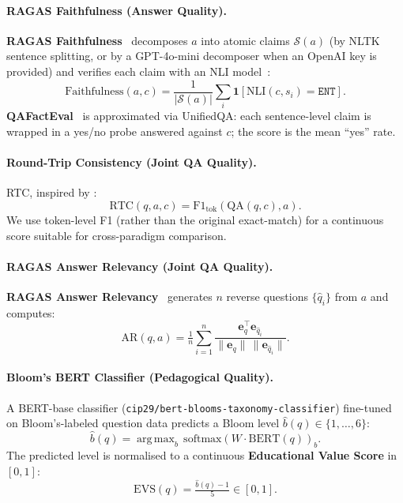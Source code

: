 \documentclass[11pt]{article}
\theoremstyle{plain}
\theoremstyle{definition}
\theoremstyle{remark}
\DeclareMathOperator*{\argmax}{arg\,max}
\begin{document}
\paragraph{RAGAS Faithfulness (Answer Quality).}
\textbf{RAGAS Faithfulness}~\citep{es2023ragas}
decomposes $a$ into atomic claims $\mathcal{S}(a)$
(by NLTK sentence splitting, or by a GPT-4o-mini
decomposer when an OpenAI key is provided) and
verifies each claim with an NLI
model~\citep{he2021deberta}:
\begin{equation}
  \mathrm{Faithfulness}(a, c)
  = \frac{1}{|\mathcal{S}(a)|}\!
    \sum_i \mathbf{1}[\mathrm{NLI}(c, s_i){=}\texttt{ENT}].
  \label{eq:faithfulness}
\end{equation}
\textbf{QAFactEval}~\citep{fabbri2022qafacteval} is
approximated via UnifiedQA: each sentence-level claim
is wrapped in a yes/no probe answered against $c$;
the score is the mean ``yes'' rate.

\paragraph{Round-Trip Consistency (Joint QA Quality).}
RTC, inspired by \citet{alberti2019synthetic}:
\begin{equation}
  \mathrm{RTC}(q, a, c)
  = \mathrm{F1}_{\text{tok}}\!\left(
      \mathrm{QA}(q, c), a
    \right).
  \label{eq:rtc}
\end{equation}
We use token-level F1 (rather than the original
exact-match) for a continuous score suitable for
cross-paradigm comparison.

\paragraph{RAGAS Answer Relevancy (Joint QA Quality).}
\textbf{RAGAS Answer Relevancy}~\citep{es2023ragas}
generates $n$ reverse questions $\{\hat{q}_i\}$ from
$a$ and computes:
\begin{equation}
  \mathrm{AR}(q, a) =
  \tfrac{1}{n}\!\sum_{i=1}^{n}
    \frac{\mathbf{e}_q^{\!\top}\mathbf{e}_{\hat{q}_i}}
         {\|\mathbf{e}_q\|\,\|\mathbf{e}_{\hat{q}_i}\|}.
  \label{eq:answer_relevancy}
\end{equation}

\paragraph{Bloom's BERT Classifier (Pedagogical Quality).}
A BERT-base classifier
(\texttt{cip29/bert-blooms-taxonomy-classifier})
fine-tuned on Bloom's-labeled question data
predicts a Bloom level $\hat{b}(q) \in \{1,
\ldots, 6\}$:
\begin{equation}
  \hat{b}(q) = \argmax_{b}\,
    \mathrm{softmax}(W \cdot \mathrm{BERT}(q))_b.
  \label{eq:bloom_bert}
\end{equation}
The predicted level is normalised to a continuous
\textbf{Educational Value Score} in $[0, 1]$:
\begin{equation}
  \mathrm{EVS}(q) = \tfrac{\hat{b}(q) - 1}{5}
  \in [0, 1].
  \label{eq:evs}
\end{equation}
\end{document}
